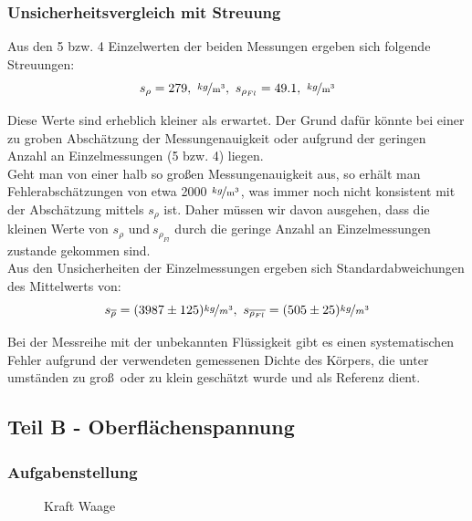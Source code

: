 \documentclass[11pt,a4paper]{article}
\begin{document}
\subsubsection{Unsicherheitsvergleich mit Streuung}

Aus den 5 bzw. 4 Einzelwerten der beiden Messungen ergeben sich folgende Streuungen:\\

$$s_\rho=279,\ \mathrm{\nicefrac{kg}{m^3}},\ s_{\rho_{Fl}}=49.1,\ \mathrm{\nicefrac{kg}{m^3}}$$

Diese Werte sind erheblich kleiner als erwartet. Der Grund daf\"ur k\"onnte bei einer zu groben Absch\"atzung der Messungenauigkeit oder aufgrund der geringen Anzahl an Einzelmessungen (5 bzw. 4) liegen.\\

Geht man von einer halb so gro\ss en Messungenauigkeit aus, so erh\"alt man Fehlerabsch\"atzungen von etwa 2000 $\mathrm{\nicefrac{kg}{m^3}}$, was immer noch nicht konsistent mit der Absch\"atzung mittels $s_\rho$ ist. Daher m\"ussen wir davon ausgehen, dass die kleinen Werte von $s_\rho\textrm{ und}\ s_{\rho_{Fl}}$ durch die geringe Anzahl an Einzelmessungen zustande gekommen sind.\\

Aus den Unsicherheiten der Einzelmessungen ergeben sich Standardabweichungen des Mittelwerts von:\\
\[
s_{\overline{\rho}}=(3987\pm125)\nicefrac{kg}{m^3},\ 
s_{\overline{\rho_{Fl}}}=(505\pm25)\nicefrac{kg}{m^3}
\]

Bei der Messreihe mit der unbekannten Fl\"ussigkeit gibt es einen systematischen Fehler aufgrund der verwendeten gemessenen Dichte des K\"orpers, die unter umst\"anden zu gro\ss\ oder zu klein gesch\"atzt wurde und als Referenz dient.
\pagebreak
\subsection{Teil B - Oberfl\"achenspannung}
\subsubsection{Aufgabenstellung}

\begin{figure}[h] 
\centering
{}
   \renewcommand\thefigure{B2}
\caption{Kraft Waage}
\label{NS1}
\end{figure}
\end{document}
